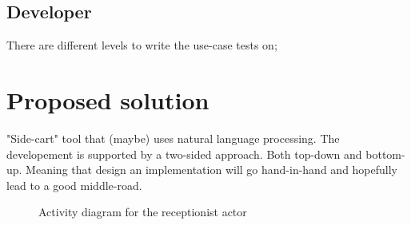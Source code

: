 \subsection{Developer}
There are different levels to write the use-case tests on;


%

\section{Proposed solution}
"Side-cart" tool that (maybe) uses natural language processing. The developement is supported by a two-sided approach. Both top-down and bottom-up. Meaning that design an implementation will go hand-in-hand and hopefully lead to a good middle-road.


\begin{figure}[h]
\centering
\caption{Activity diagram for the receptionist actor}
\label{fig:activity_diagram_receptionist}
\end{figure}



